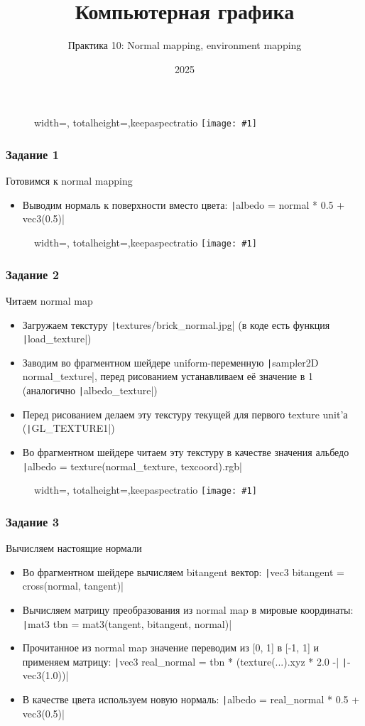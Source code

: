 \documentclass[10pt]{beamer}
\title{Компьютерная графика}
\subtitle{Практика 10: Normal mapping, environment mapping}
\date{2025}
\newcommand{\slideimage}[1]{
  \begin{figure}
    \begin{adjustbox}{width=\textwidth, totalheight=\textheight-2\baselineskip-2\baselineskip,keepaspectratio}
      \texttt{[image: \#1]}
    \end{adjustbox}
  \end{figure}
}
\begin{document}
\frame{\titlepage}

\begin{frame}[fragile]
\slideimage{0.png}
\end{frame}

\begin{frame}[fragile]
\frametitle{Задание 1}
Готовимся к normal mapping
\begin{itemize}
\item Выводим нормаль к поверхности вместо цвета: \texttt|albedo = normal * 0.5 + vec3(0.5)|
\end{itemize}
\end{frame}

\begin{frame}[fragile]
\slideimage{1.png}
\end{frame}

\begin{frame}[fragile]
\frametitle{Задание 2}
Читаем normal map
\begin{itemize}
\item Загружаем текстуру \texttt|textures/brick_normal.jpg| (в коде есть функция \texttt|load_texture|)
\item Заводим во фрагментном шейдере uniform-переменную \texttt|sampler2D normal_texture|, перед рисованием устанавливаем её значение в 1 (аналогично \texttt|albedo_texture|)
\item Перед рисованием делаем эту текстуру текущей для первого texture unit'а (\texttt|GL_TEXTURE1|)
\item Во фрагментном шейдере читаем эту текстуру в качестве значения альбедо \texttt|albedo = texture(normal_texture, texcoord).rgb|
\end{itemize}
\end{frame}

\begin{frame}[fragile]
\slideimage{2.png}
\end{frame}

\begin{frame}[fragile]
\frametitle{Задание 3}
Вычисляем настоящие нормали
\begin{itemize}
\item Во фрагментном шейдере вычисляем bitangent вектор: \texttt|vec3 bitangent = cross(normal, tangent)|
\item Вычисляем матрицу преобразования из normal map в мировые координаты: \texttt|mat3 tbn = mat3(tangent, bitangent, normal)|
\item Прочитанное из normal map значение переводим из [0, 1] в [-1, 1] и применяем матрицу: \texttt|vec3 real_normal = tbn * (texture(...).xyz * 2.0 -| \texttt|- vec3(1.0))|
\item В качестве цвета используем новую нормаль: \texttt|albedo = real_normal * 0.5 + vec3(0.5)|
\end{itemize}
\end{frame}
\end{document}
